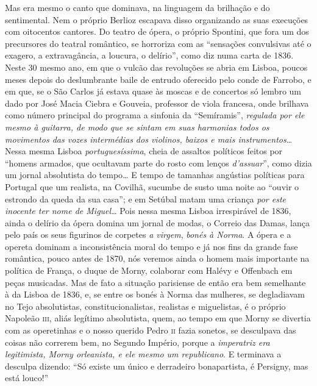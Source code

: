 Mas era mesmo o canto que dominava, na linguagem da brilhação e do
sentimental. Nem o próprio Berlioz escapava disso organizando as suas
execuções com oitocentos cantores. Do teatro de ópera, o próprio
Spontini, que fora um dos precursores do teatral romântico, se horroriza
com as ``sensações convulsivas até o exagero, a extravagância, a
loucura, o delírio'', como diz numa carta de 1836. Neste 30 mesmo ano,
em que o vulcão das revoluções se abria em Lisboa, poucos meses depois
do deslumbrante baile de entrudo oferecido pelo conde de Farrobo, e em
que, se o São Carlos já estava quase às moscas e de concertos só lembro
um dado por José Macia Ciebra e Gouveia, professor de viola francesa,
onde brilhava como número principal do programa a sinfonia da
``Semíramis'', \textit{regulada por ele mesmo à guitarra, de modo que se
sintam em suas harmonias todos os movimentos das vozes intermédias dos
violinos, baixos e mais instrumentos}\ldots{} Nessa mesma Lisboa
\textit{portuguesíssima}, cheia de assaltos políticos feitos por ``homens
armados, que ocultavam parte do rosto com lenços \textit{d'assuar}'', como dizia
um jornal absolutista do tempo\ldots{} E tempo de tamanhas angústias
políticas para Portugal que um realista, na Covilhã, sucumbe de susto
uma noite ao ``ouvir o estrondo da queda da sua casa''; e em Setúbal
matam uma criança \textit{por este inocente ter nome de Miguel}\ldots{} Pois nessa
mesma Lisboa irrespirável de 1836, ainda o delírio da ópera domina um
jornal de modas, o Correio das Damas, lança pelo país os seus figurinos
de corpetes \textit{a virgem}, \textit{bonés à Norma}. A ópera e a opereta dominam
a inconsistência moral do tempo e já nos fins da grande fase romântica,
pouco antes de 1870, nós veremos ainda o homem mais importante na política
de França, o duque de Morny, colaborar com Halévy e Offenbach em peças
musicadas. Mas de fato a situação parisiense de então era bem semelhante
à da Lisboa de 1836, e, se entre os bonés à Norma das mulheres, se
degladiavam no Tejo absolutistas, constitucionalistas, realistas e
miguelistas, é o próprio Napoleão \textsc{iii}, aliás legítimo absolutista, quem,
ao tempo em que Morny se divertia com as operetinhas e o nosso querido
Pedro \textsc{ii} fazia sonetos, se desculpava das coisas não correrem bem, no
Segundo Império, porque a \textit{imperatriz era legitimista, Morny
orleanista, e ele mesmo um republicano}. E terminava a desculpa
dizendo: ``Só existe um único e derradeiro bonapartista, é Persigny, mas
está louco!''

